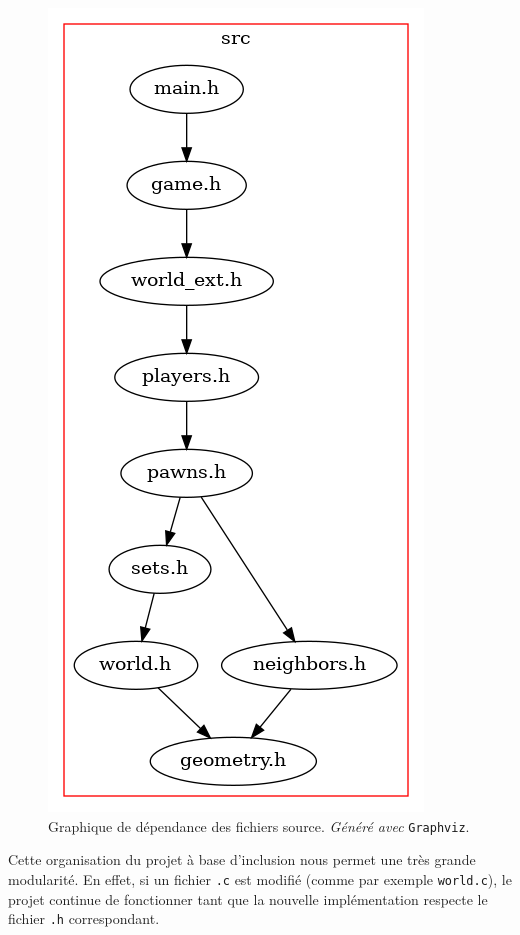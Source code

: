         \begin{figure}[H]
            \centering
            \includegraphics[scale=0.4]{img/graph_src.png}
            \caption{Graphique de dépendance des fichiers source. \textit{Généré avec} \texttt{Graphviz}.}
            \label{fig:graph_src}
        \end{figure}

        Cette organisation du projet à base d'inclusion nous permet une très grande modularité. En effet, si un fichier \texttt{.c} est modifié (comme par exemple \texttt{world.c}), le projet continue de fonctionner tant que la nouvelle implémentation respecte le fichier \texttt{.h} correspondant.

